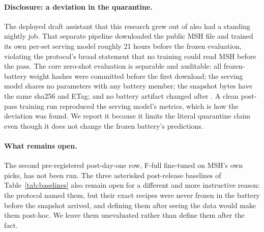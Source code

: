 \paragraph{Disclosure: a deviation in the quarantine.}
The deployed draft assistant that this research grew out of also had a
standing nightly job. That separate pipeline downloaded the public MSH
file and trained its own per-set serving model roughly 21 hours before the
frozen evaluation, violating the protocol's broad statement that no
training could read MSH before the pass. The core zero-shot evaluation is
separable and auditable: all frozen-battery weight hashes were committed
before the first download; the serving model shares no parameters with any
battery member; the snapshot bytes have the same sha256 and ETag; and no
battery artifact changed after \texttt{\ProtocolTag}. A clean post-pass
training run reproduced the serving model's metrics, which is how the
deviation was found. We report it because it limits the literal quarantine
claim even though it does not change the frozen battery's predictions.

\paragraph{What remains open.}
The second pre-registered post-day-one row, F-full fine-tuned on MSH's
own picks, has not been run. The three asterisked post-release baselines
of Table~\ref{tab:baselines} also remain open for a different and more
instructive reason: the protocol named them, but their exact recipes
were never frozen in the battery before the snapshot arrived, and
defining them after seeing the data would make them post-hoc. We leave
them unevaluated rather than define them after the fact.
